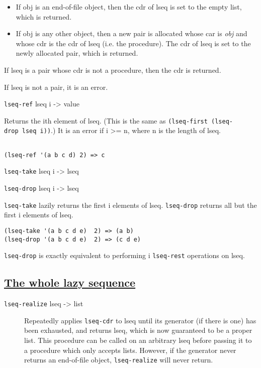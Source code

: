 \begin{itemize}
\tightlist
\item
  If obj is an end-of-file object, then the cdr of lseq is set to the
  empty list, which is returned.
\item
  If obj is any other object, then a new pair is allocated whose car is
  \emph{obj} and whose cdr is the cdr of lseq (i.e. the procedure). The
  cdr of lseq is set to the newly allocated pair, which is returned.
\end{itemize}

If lseq is a pair whose cdr is not a procedure, then the cdr is
returned.

If lseq is not a pair, it is an error.

\texttt{lseq-ref} lseq i -\textgreater{} value

Returns the ith element of lseq. (This is the same as
\texttt{(lseq-first\ (lseq-drop\ lseq\ i))}.) It is an error if i
\textgreater{}= n, where n is the length of lseq.

\begin{verbatim}
    
(lseq-ref '(a b c d) 2) => c
\end{verbatim}

\href{}{} \texttt{lseq-take} lseq i -\textgreater{} lseq

\href{}{} \texttt{lseq-drop} lseq i -\textgreater{} lseq

\texttt{lseq-take} lazily returns the first i elements of lseq.
\texttt{lseq-drop} returns all but the first i elements of lseq.

\begin{verbatim}
(lseq-take '(a b c d e)  2) => (a b)
(lseq-drop '(a b c d e)  2) => (c d e)
\end{verbatim}

\texttt{lseq-drop} is exactly equivalent to performing i
\texttt{lseq-rest} operations on lseq.

\subsection{\texorpdfstring{\href{}{The whole lazy
sequence}}{The whole lazy sequence}}\label{the-whole-lazy-sequence}

\begin{description}
\item[ \href{}{} \texttt{lseq-realize} lseq -\textgreater{} list ]
Repeatedly applies \texttt{lseq-cdr} to lseq until its generator (if
there is one) has been exhausted, and returns lseq, which is now
guaranteed to be a proper list. This procedure can be called on an
arbitrary lseq before passing it to a procedure which only accepts
lists. However, if the generator never returns an end-of-file object,
\texttt{lseq-realize} will never return.
\end{description}

